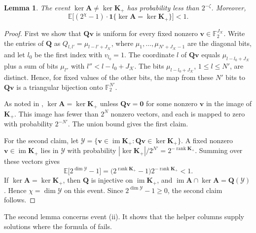 \documentclass[b5paper, 10pt, abstract=true, captions=tableheading]{scrartcl}
\theoremstyle{plain}
\newtheorem{lemma}{Lemma}
\theoremstyle{definition}
\newcommand{\FF}{\mathds{F}}
\newcommand{\rank}{\operatorname{rank}}
\renewcommand{\vec}[1]{\symbf{#1}}
\newcommand{\mat}[1]{\symbf{#1}}
\newcommand{\calK}{\mathcal{K}}
\begin{document}
\begin{lemma}\label{lem:wiedemann-compression}
The event $\ker\mat A\neq\ker\mat K_+$ has probability less than
$2^{-\zeta}$. Moreover,
\[
  \mathbb E\bigl[(2^{\chi}-1)\cdot\mathbf 1\{\ker\mat A=\ker\mat K_+\}\bigr]
  <1.
\]
\end{lemma}
\begin{proof}
First we show that $\mat Q\vec v$ is uniform for every fixed nonzero
$\vec v\in\FF_2^{J_{\calK}}$. Write the entries of $\mat Q$ as
$Q_{l,l'}=\mu_{l-l'+J_{\calK}}$, where $\mu_1,\ldots,\mu_{N'+J_{\calK}-1}$ are
the diagonal bits, and let $l_0$ be the first index with $v_{l_0}=1$. The
coordinate $l$ of $\mat Q\vec v$ equals $\mu_{l-l_0+J_{\calK}}$ plus a sum
of bits $\mu_{l''}$ with $l''<l-l_0+J_{\calK}$. The bits
$\mu_{l-l_0+J_{\calK}}$, $1\leq l\leq N'$, are distinct. Hence, for fixed
values of the other bits, the map from these $N'$ bits to $\mat Q\vec v$
is a triangular bijection onto $\FF_2^{N'}$.

As noted in , $\ker\mat A=\ker\mat K_+$
unless $\mat Q\vec v=\vec0$ for some nonzero $\vec v$ in the image of
$\mat K_+$. This image has fewer than $2^{N}$ nonzero vectors, and each is
mapped to zero with probability $2^{-N'}$. The union bound gives the first
claim.

For the second claim, let
$\mathcal Y=\{\vec v\in\operatorname{im}\mat K_+:\mat Q\vec v\in\ker\mat K_+\}$.
A fixed nonzero $\vec v\in\operatorname{im}\mat K_+$ lies in $\mathcal Y$
with probability $|\ker\mat K_+|/2^{N'}=2^{-\rank\mat K_+}$. Summing over
these vectors gives
\[
  \mathbb E\bigl[2^{\dim\mathcal Y}-1\bigr]
  =\bigl(2^{\rank\mat K_+}-1\bigr)2^{-\rank\mat K_+}<1.
\]
If $\ker\mat A=\ker\mat K_+$, then $\mat Q$ is injective on
$\operatorname{im}\mat K_+$, and
$\operatorname{im}\mat A\cap\ker\mat A=\mat Q(\mathcal Y)$. Hence
$\chi=\dim\mathcal Y$ on this event. Since $2^{\dim\mathcal Y}-1\geq0$,
the second claim follows.
\end{proof}

The second lemma concerns event (ii). It shows that the helper columns
supply solutions where the formula of 
fails.
\end{document}
